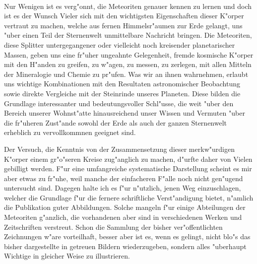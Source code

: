\documentclass[a4paper, 11pt, oneside, polutonikogreek, german]{article}
\begin{document}
\paragraph*{}
Nur Wenigen ist es verg"onnt, die Meteoriten genauer kennen zu lernen und doch ist es der Wunsch Vieler sich mit den wichtigsten Eigenschaften dieser K"orper vertraut zu machen, welche aus fernen Himmelsr"aumen zur Erde gelangt, uns "uber einen Teil der Sternenwelt unmittelbare Nachricht bringen. Die Meteoriten, diese Splitter untergegangener oder vielleicht noch kreisender planetarischer Massen, geben uns eine fr"uher ungeahnte Gelegenheit, fremde kosmische K"orper mit den H"anden zu greifen, zu w"agen, zu messen, zu zerlegen, mit allen Mitteln der Mineralogie und Chemie zu pr"ufen. Was wir an ihnen wahrnehmen, erlaubt uns wichtige Kombinationen mit den Resultaten astronomischer Beobachtung sowie direkte Vergleiche mit der Steinrinde unseres Planeten. Diese bilden die Grundlage interessanter und bedeutungsvoller Schl"usse, die weit "uber den Bereich unserer Wohnst"atte hinausreichend unser Wissen und Vermuten "uber die fr"uheren Zust"ande sowohl der Erde als auch der ganzen Sternenwelt erheblich zu vervollkommnen geeignet sind.

Der Versuch, die Kenntnis von der Zusammensetzung dieser merkw"urdigen K"orper einem gr"o"seren Kreise zug"anglich zu machen, d"urfte daher von Vielen gebilligt werden. F"ur eine umfangreiche systematische Darstellung scheint es mir aber etwas zu fr"uhe, weil manche der einfacheren F"alle noch nicht gen"ugend untersucht sind. Dagegen halte ich es f"ur n"utzlich, jenen Weg einzuschlagen, welcher die Grundlage f"ur die fernere schriftliche Verst"andigung bietet, n"amlich die Publikation guter Abbildungen. Solche mangeln f"ur einige Abteilungen der Meteoriten g"anzlich, die vorhandenen aber sind in verschiedenen Werken und Zeitschriften verstreut. Schon die Sammlung der bisher ver"offentlichten Zeichnungen w"are vorteilhaft, besser aber ist es, wenn es gelingt, nicht blo"s das bisher dargestellte in getreuen Bildern wiederzugeben, sondern alles "uberhaupt Wichtige in gleicher Weise zu illustrieren.
\end{document}
